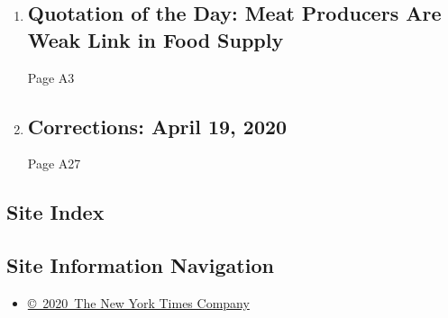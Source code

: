 \begin{enumerate}
\def\labelenumi{\arabic{enumi}.}
\item
  \href{/2020/04/18/todayspaper/quotation-of-the-day-meat-producers-are-weak-link-in-food-supply.html}{}

  \hypertarget{quotation-of-the-day-meat-producers-are-weak-link-in-food-supply}{%
  \subsection{Quotation of the Day: Meat Producers Are Weak Link in Food
  Supply}\label{quotation-of-the-day-meat-producers-are-weak-link-in-food-supply}}

  Page A3
\item
  \href{/2020/04/18/pageoneplus/corrections-april-19-2020.html}{}

  \hypertarget{corrections-april-19-2020}{%
  \subsection{Corrections: April 19,
  2020}\label{corrections-april-19-2020}}

  Page A27
\end{enumerate}

\hypertarget{site-index}{%
\subsection{Site Index}\label{site-index}}

\hypertarget{site-information-navigation}{%
\subsection{Site Information
Navigation}\label{site-information-navigation}}

\begin{itemize}
\tightlist
\item
  \href{https://help.nytimes3xbfgragh.onion/hc/en-us/articles/115014792127-Copyright-notice}{©~2020~The
  New York Times Company}
\end{itemize}

